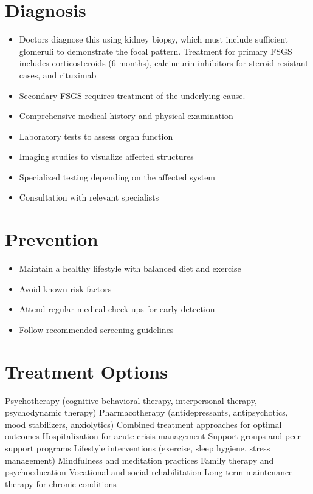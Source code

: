 \section{Diagnosis}
\begin{itemize}[noitemsep]
  \item Doctors diagnose this using kidney biopsy, which must include sufficient glomeruli to demonstrate the focal pattern. Treatment for primary FSGS includes corticosteroids (6 months), calcineurin inhibitors for steroid-resistant cases, and rituximab
  \item Secondary FSGS requires treatment of the underlying cause.
  \item Comprehensive medical history and physical examination
  \item Laboratory tests to assess organ function
  \item Imaging studies to visualize affected structures
  \item Specialized testing depending on the affected system
  \item Consultation with relevant specialists
\end{itemize}
\section{Prevention}
\begin{itemize}[noitemsep]
  \item Maintain a healthy lifestyle with balanced diet and exercise
  \item Avoid known risk factors
  \item Attend regular medical check-ups for early detection
  \item Follow recommended screening guidelines
\end{itemize}
\section{Treatment Options}
Psychotherapy (cognitive behavioral therapy, interpersonal therapy, psychodynamic therapy) Pharmacotherapy (antidepressants, antipsychotics, mood stabilizers, anxiolytics) Combined treatment approaches for optimal outcomes Hospitalization for acute crisis management Support groups and peer support programs Lifestyle interventions (exercise, sleep hygiene, stress management) Mindfulness and meditation practices Family therapy and psychoeducation Vocational and social rehabilitation Long-term maintenance therapy for chronic conditions


